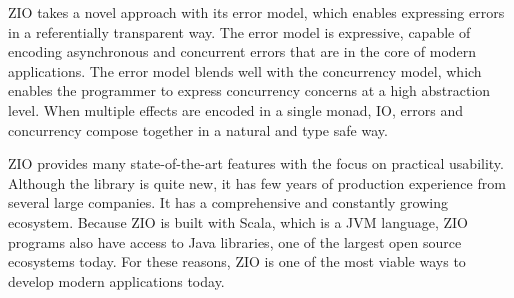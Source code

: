 ZIO takes a novel approach with its error model, which enables expressing errors in a referentially transparent way. The error model is expressive, capable of encoding asynchronous and concurrent errors that are in the core of modern applications. The error model blends well with the concurrency model, which enables the programmer to express concurrency concerns at a high abstraction level. When multiple effects are encoded in a single monad, IO, errors and concurrency compose together in a natural and type safe way.

ZIO provides many state-of-the-art features with the focus on practical usability. Although the library is quite new, it has few years of production experience from several large companies. It has a comprehensive and constantly growing ecosystem. Because ZIO is built with Scala, which is a JVM language, ZIO programs also have access to Java libraries, one of the largest open source ecosystems today. For these reasons, ZIO is one of the most viable ways to develop modern applications today.
